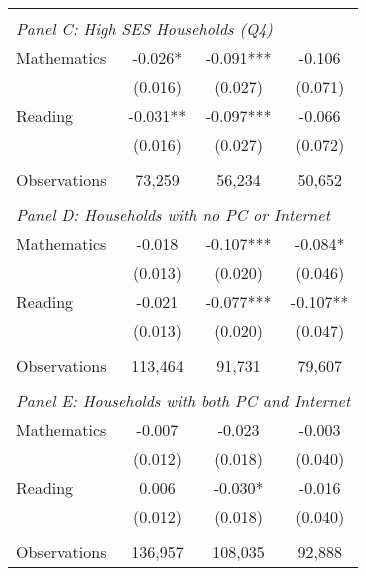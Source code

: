{\begin{tabular}{lccc}
&  &  &   \\
\multicolumn{4}{l}{\textit{Panel C: High SES Households (Q4)}} \\
\hspace{3mm}Mathematics&      -0.026*  &      -0.091***&      -0.106   \\
                    &     (0.016)   &     (0.027)   &     (0.071)   \\
 
\hspace{3mm}Reading &      -0.031** &      -0.097***&      -0.066   \\
                    &     (0.016)   &     (0.027)   &     (0.072)   \\
                    &               &               &               \\
\hspace{3mm}Observations&      73,259   &      56,234   &      50,652   \\
 
&  &  &   \\
\multicolumn{4}{l}{\textit{Panel D: Households with no PC or Internet}} \\
\hspace{3mm}Mathematics&      -0.018   &      -0.107***&      -0.084*  \\
                    &     (0.013)   &     (0.020)   &     (0.046)   \\
 
\hspace{3mm}Reading &      -0.021   &      -0.077***&      -0.107** \\
                    &     (0.013)   &     (0.020)   &     (0.047)   \\
                    &               &               &               \\
\hspace{3mm}Observations&     113,464   &      91,731   &      79,607   \\
 
&  &  &   \\
\multicolumn{4}{l}{\textit{Panel E: Households with both PC and Internet}} \\
\hspace{3mm}Mathematics&      -0.007   &      -0.023   &      -0.003   \\
                    &     (0.012)   &     (0.018)   &     (0.040)   \\
 
\hspace{3mm}Reading &       0.006   &      -0.030*  &      -0.016   \\
                    &     (0.012)   &     (0.018)   &     (0.040)   \\
                    &               &               &               \\
\hspace{3mm}Observations&     136,957   &     108,035   &      92,888   \\
 

\bottomrule
\end{tabular}
}
